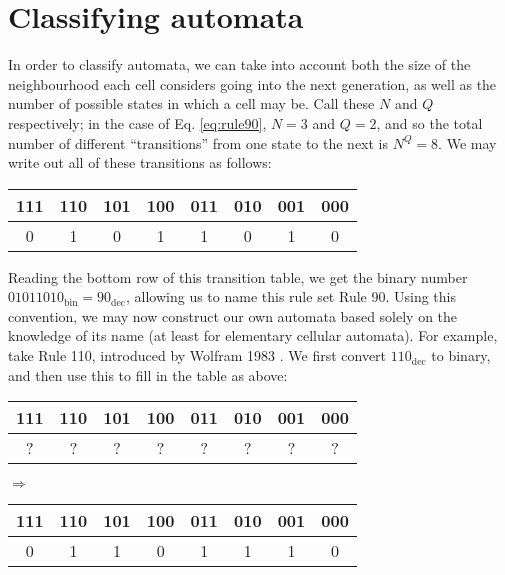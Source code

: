\documentclass[11pt,a4paper]{article}
\begin{document}
\section{Classifying automata}
    In order to classify automata, we can take into account both the size of the
    neighbourhood each cell considers going into the next generation, as well as
    the number of possible states in which a cell may be. Call these $N$ and $Q$
    respectively; in the case of Eq. \ref{eq:rule90}, $N=3$ and $Q=2$, and so the
    total number of different ``transitions'' from one state to the next is $N^Q
    = 8$. We may write out all of these transitions as follows:

    \begin{table}[h]
        \centering
        \begin{tabular}{c|c|c|c|c|c|c|c}
            111 & 110 & 101 & 100 & 011 & 010 & 001 & 000 \\
            \hline
            0   & 1   & 0   & 1   & 1   & 0   & 1   & 0
        \end{tabular}
    \end{table}

    Reading the bottom row of this transition table, we get the binary number
    $01011010_{\text{bin}} = 90_{\text{dec}}$, allowing us to name this rule set
    Rule 90. Using this convention, we may now construct our own automata based
    solely on the knowledge of its name (at least for elementary cellular
    automata). For example, take Rule 110, introduced by Wolfram 1983
    \cite{WolframRule110}. We first convert $110_{\text{dec}}$ to binary, and
    then use this to fill in the table as above:

    \begin{table}[h]
        \begin{minipage}{.5\linewidth}
            \centering
            \begin{tabular}{c|c|c|c|c|c|c|c}
                111 & 110 & 101 & 100 & 011 & 010 & 001 & 000 \\
                \hline
                ? & ? & ? & ? & ? & ? & ? & ?
            \end{tabular}
        \end{minipage}%
        $ \Rightarrow $
        \begin{minipage}{.6\linewidth}
            \begin{tabular}{c|c|c|c|c|c|c|c}
                111 & 110 & 101 & 100 & 011 & 010 & 001 & 000 \\
                \hline
                0 & 1 & 1 & 0 & 1 & 1 & 1 & 0
            \end{tabular}
        \end{minipage}
    \end{table}
\end{document}
